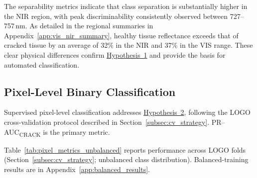 \FloatBarrier

\noindent
The separability metrics indicate that class separation is substantially higher in the NIR region, with peak discriminability consistently observed between 727--757\,nm. As detailed in the regional summaries in Appendix~\ref{app:vis_nir_summary}, healthy tissue reflectance exceeds that of cracked tissue by an average of 32\% in the NIR and 37\% in the VIS range. These clear physical differences confirm \hyperref[hyp:spectral_distinguishability]{Hypothesis~1} and provide the basis for automated classification.
\begin{landscape}
\thispagestyle{plain}

\section{Pixel-Level Binary Classification}
\label{sec:pixel-level-classification}

\noindent
Supervised pixel-level classification addresses \hyperref[hyp:pixel_level_feasibility]{Hypothesis~2}, following the LOGO cross-validation protocol described in Section~\ref{subsec:cv_strategy}. PR--AUC\textsubscript{CRACK} is the primary metric.

\graphicspath{{results/Binary_Pixel_Level_Classification/}}




\FloatBarrier


\noindent
Table~\ref{tab:pixel_metrics_unbalanced} reports performance across LOGO folds (Section~\ref{subsec:cv_strategy}; unbalanced class distribution). Balanced-training results are in Appendix~\ref{app:balanced_results}.

\medskip


\end{landscape}
